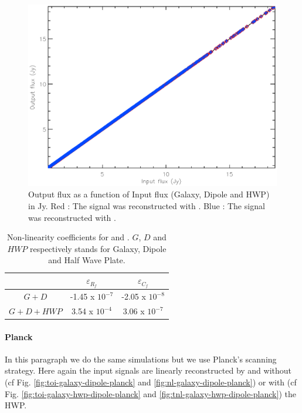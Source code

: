 \begin{figure}[h]
\center
	\includegraphics[scale=0.5]{Figures/NL-galaxy-hwp-dipole.eps}
	\caption{Output flux as a function of Input flux (Galaxy, Dipole and HWP) in Jy. Red : The signal was reconstructed with \cf. Blue : The signal was reconstructed with \rf.}
	\label{fig:nl-galaxy-hwp-dipole-pol}
\end{figure}

\begin{table}[h!]
\center
	\begin{tabular}{|c|c|c|}
  	\hline
 	\backslashbox{$Input signal$}{$\varepsilon$} & $	\varepsilon_{R_{f}}$ & $\varepsilon_{C_{f}} $ \\
	\hline
 	$G+D$  & -1.45 x $10^{-7}$ & -2.05 x $10^{-8}$ \\
  	\hline
 	$G+D+HWP$ & 3.54 x $10^{-4}$ & 3.06 x $10^{-7}$ \\
  	\hline
	\end{tabular} 
\caption{Non-linearity coefficients \eps for \rf and \cf. $G$, $D$ and $HWP$ respectively stands for Galaxy, Dipole and Half Wave Plate.}
\label{tab:eps-galaxy-hwp-dipole-pol}
\end{table}

\paragraph{Planck \\}

In this paragraph we do the same simulations but we use Planck's scanning strategy. 
Here again the input signals are linearly reconstructed by \rf and \cf without (cf Fig. \ref{fig:toi-galaxy-dipole-planck} and \ref{fig:nl-galaxy-dipole-planck}) or with (cf Fig. \ref{fig:toi-galaxy-hwp-dipole-planck} and \ref{fig:tnl-galaxy-hwp-dipole-planck}) the HWP.

